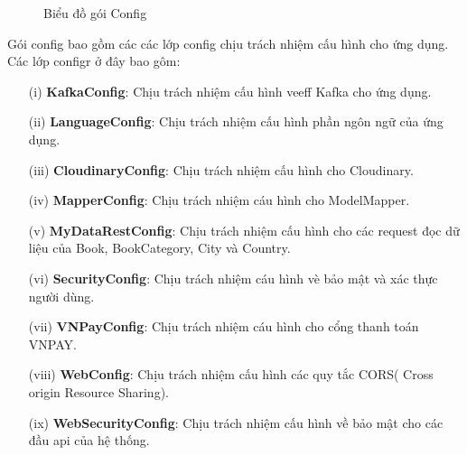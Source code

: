 \documentclass[../DoAn.tex]{subfiles}
\begin{document}
\begin{figure}[H]
    \centering
    \caption{Biểu đồ gói Config}
    \label{fig:Fig3}
\end{figure}
Gói config bao gồm các các lớp config chịu trách nhiệm cấu hình cho ứng dụng. Các lớp configr ở đây bao gôm:
\begin{enumerate}
    \item [(i)] \textbf{KafkaConfig}: Chịu trách nhiệm cấu hình veeff Kafka cho ứng dụng.
    \item [(ii)]\textbf{LanguageConfig}: Chịu trách nhiệm cấu hình phần ngôn ngữ của ứng dụng.
    \item[(iii)] \textbf{CloudinaryConfig}: Chịu trách nhiệm cấu hình  cho Cloudinary.
    \item[(iv)] \textbf{MapperConfig}: Chịu trách nhiệm cáu hình cho ModelMapper.
    \item[(v)] \textbf{MyDataRestConfig}: Chịu trách nhiệm cấu hình cho các request đọc dữ liệu của Book, BookCategory, City và Country.
    \item[(vi)] \textbf{SecurityConfig}: Chịu trách nhiệm cáu hình vè bảo mật và xác thực người dùng.
    \item[(vii)] \textbf{VNPayConfig}: Chịu trách nhiệm cáu hình cho cổng thanh toán VNPAY.
    \item[(viii)] \textbf{WebConfig}: Chịu trách nhiệm cấu hình các quy tắc CORS( Cross origin Resource Sharing).
    \item[(ix)] \textbf{WebSecurityConfig}: Chịu trách nhiệm cấu hình về bảo mật cho các đầu api của hệ thống.
\end{enumerate}
\end{document}
